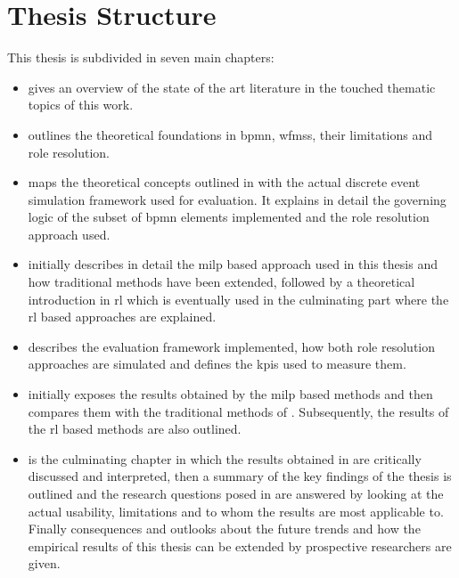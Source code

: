 \section{Thesis Structure}

This thesis is subdivided in seven main chapters:

\begin{itemize}
	\item {} gives an overview of the state of the art literature in the touched thematic topics of this work.
	\item {} outlines the theoretical foundations in \gls{bpmn}, \glspl{wfms}, their limitations and role resolution. 
	\item {} maps the theoretical concepts outlined in  with the actual discrete event simulation framework used for evaluation. It explains in detail the governing logic of the subset of \gls{bpmn} elements implemented and the role resolution approach used.
	\item {} initially describes in detail the \gls{milp} based approach used in this thesis and how traditional methods have been extended, followed by a theoretical introduction in \gls{rl} which is eventually used in the culminating part where the \gls{rl} based approaches are explained.
	\item {} describes the evaluation framework implemented, how both role resolution approaches are simulated and defines the \glspl{kpi} used to measure them.
	\item {} initially exposes the results obtained by the \gls{milp} based methods and then compares them with the traditional methods of \citet{Zeng2005}. Subsequently, the results of the \gls{rl} based methods are also outlined.
	\item {} is the culminating chapter in which the results obtained in  are critically discussed and interpreted, then	a summary of the key findings of the thesis is outlined and the research questions posed in  are answered by looking at the actual usability, limitations and to whom the results are most applicable to. Finally consequences and outlooks about the future trends and how the empirical results of this thesis can be extended by prospective researchers are given.
\end{itemize}